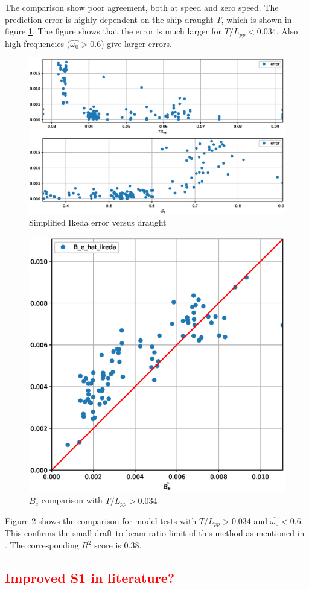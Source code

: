 The comparison show poor agreement, both at speed and zero speed. The prediction error is highly dependent on the ship draught $T$, which is shown in figure  \ref{fig:B_e_hat_error}.
The figure shows that the error is much larger for $T/L_{pp}<0.034$. Also high frequencies ($\hat{\omega_0} > 0.6$) give larger errors.

\begin{figure}[H]
    \centering
    \includegraphics[width=0.9\columnwidth]{figures/B_e_hat_error.eps}
    \caption{Simplified Ikeda error versus draught}
    \label{fig:B_e_hat_error}
\end{figure}

\begin{figure}[H]
    \centering
    \includegraphics[width=0.9\columnwidth]{figures/B_e_hat_good.eps}
    \caption{$\hat{B_e}$ comparison with $T/L_{pp}>0.034$}
    \label{fig:B_e_hat_good}
\end{figure}

Figure \ref{fig:B_e_hat_good} shows the comparison for  model tests with $T/L_{pp}>0.034$ and $\hat{\omega_0} < 0.6$.
This confirms the small draft to beam ratio limit of this method as mentioned in \parencite{kawahara_simple_2011}. The corresponding $R^2$ score is 0.38.

\textcolor{red}{\subsection{Improved S1 in literature?}}

